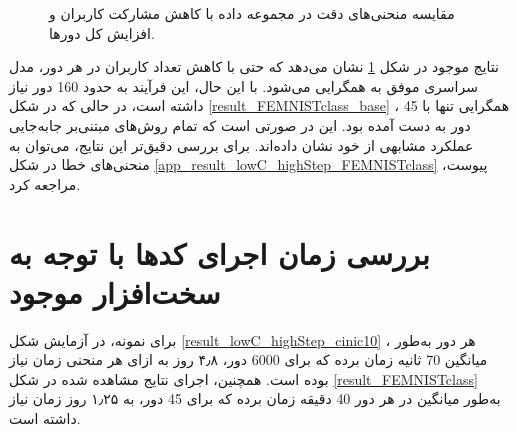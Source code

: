 \begin{figure}[b!]
	\centering
	\hspace{0.8mm}
	\caption{
		مقایسه منحنی‌های دقت در مجموعه داده
		با کاهش مشارکت کاربران و افزایش  کل دورها.
	}
	\label{result_lowC_highStep_FEMNISTclass}
\end{figure}


نتایج موجود در شکل
\ref{result_lowC_highStep_FEMNISTclass}
نشان می‌دهد که حتی با کاهش تعداد کاربران در هر دور، مدل سراسری موفق به همگرایی می‌شود. با این حال، این فرآیند به حدود 160 دور نیاز داشته است، در حالی که در شکل
\ref{result_FEMNISTclass_base}%
، همگرایی تنها با 45 دور به دست آمده بود. این در صورتی است که تمام روش‌های مبتنی‌بر جابه‌جایی عملکرد مشابهی از خود نشان داده‌اند. برای بررسی دقیق‌تر این نتایج، می‌توان به منحنی‌های خطا در شکل
\ref{app_result_lowC_highStep_FEMNISTclass}
پیوست، مراجعه کرد.



\section{
بررسی زمان اجرای کدها با توجه به سخت‌افزار موجود
}
برای نمونه، در آزمایش شکل
\ref{result_lowC_highStep_cinic10}%
، هر دور به‌طور میانگین 70 ثانیه زمان برده که برای 6000 دور، ۴٫۸ روز به ازای هر منحنی زمان نیاز بوده است. همچنین، اجرای نتایج مشاهده شده در شکل
\ref{result_FEMNISTclass}
به‌طور میانگین در هر دور 40 دقیقه زمان برده که برای 45 دور، به ۱٫۲۵ روز زمان نیاز داشته است.



